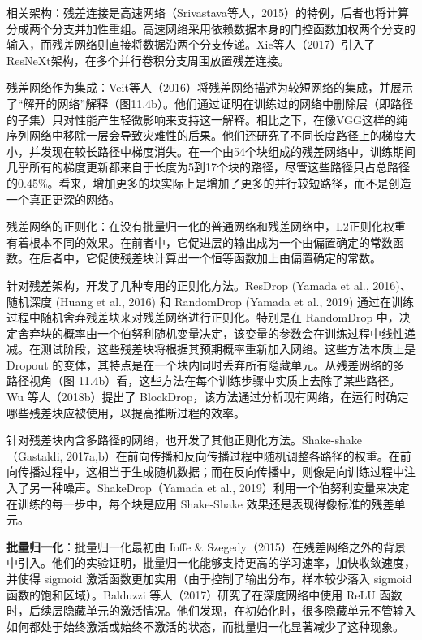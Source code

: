 \documentclass[lang=cn,newtx,10pt,scheme=chinese]{elegantbook}
\begin{document}
相关架构：残差连接是高速网络（Srivastava等人，2015）的特例，后者也将计算分成两个分支并加性重组。高速网络采用依赖数据本身的门控函数加权两个分支的输入，而残差网络则直接将数据沿两个分支传递。Xie等人（2017）引入了ResNeXt架构，在多个并行卷积分支周围放置残差连接。

残差网络作为集成：Veit等人（2016）将残差网络描述为较短网络的集成，并展示了“解开的网络”解释（图11.4b）。他们通过证明在训练过的网络中删除层（即路径的子集）只对性能产生轻微影响来支持这一解释。相比之下，在像VGG这样的纯序列网络中移除一层会导致灾难性的后果。他们还研究了不同长度路径上的梯度大小，并发现在较长路径中梯度消失。在一个由54个块组成的残差网络中，训练期间几乎所有的梯度更新都来自于长度为5到17个块的路径，尽管这些路径只占总路径的0.45\%。看来，增加更多的块实际上是增加了更多的并行较短路径，而不是创造一个真正更深的网络。

残差网络的正则化：在没有批量归一化的普通网络和残差网络中，L2正则化权重有着根本不同的效果。在前者中，它促进层的输出成为一个由偏置确定的常数函数。在后者中，它促使残差块计算出一个恒等函数加上由偏置确定的常数。

针对残差架构，开发了几种专用的正则化方法。ResDrop (Yamada et al., 2016)、随机深度 (Huang et al., 2016) 和 RandomDrop (Yamada et al., 2019) 通过在训练过程中随机舍弃残差块来对残差网络进行正则化。特别是在 RandomDrop 中，决定舍弃块的概率由一个伯努利随机变量决定，该变量的参数会在训练过程中线性递减。在测试阶段，这些残差块将根据其预期概率重新加入网络。这些方法本质上是 Dropout 的变体，其特点是在一个块内同时丢弃所有隐藏单元。从残差网络的多路径视角（图 11.4b）看，这些方法在每个训练步骤中实质上去除了某些路径。Wu 等人（2018b）提出了 BlockDrop，该方法通过分析现有网络，在运行时确定哪些残差块应被使用，以提高推断过程的效率。

针对残差块内含多路径的网络，也开发了其他正则化方法。Shake-shake（Gastaldi, 2017a,b）在前向传播和反向传播过程中随机调整各路径的权重。在前向传播过程中，这相当于生成随机数据；而在反向传播中，则像是向训练过程中注入了另一种噪声。ShakeDrop（Yamada et al., 2019）利用一个伯努利变量来决定在训练的每一步中，每个块是应用 Shake-Shake 效果还是表现得像标准的残差单元。

\textbf{批量归一化}：批量归一化最初由 Ioffe \& Szegedy（2015）在残差网络之外的背景中引入。他们的实验证明，批量归一化能够支持更高的学习速率，加快收敛速度，并使得 sigmoid 激活函数更加实用（由于控制了输出分布，样本较少落入 sigmoid 函数的饱和区域）。Balduzzi 等人（2017）研究了在深度网络中使用 ReLU 函数时，后续层隐藏单元的激活情况。他们发现，在初始化时，很多隐藏单元不管输入如何都处于始终激活或始终不激活的状态，而批量归一化显著减少了这种现象。
\end{document}
